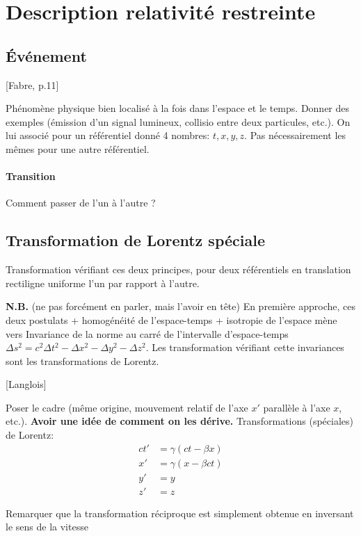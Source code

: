 \documentclass[11pt]{report}
\numberwithin{figure}{section}
\numberwithin{equation}{section}
\numberwithin{table}{section}
\newcommand{\1}{\boldsymbol{1}}
\begin{document}
\section{Description relativité restreinte}

\subsection{Événement}

[Fabre, p.11] 

Phénomène physique bien localisé à la fois dans l'espace et le temps. Donner des exemples (émission d'un signal lumineux, collisio entre deux particules, etc.). On lui associé pour un référentiel donné 4 nombres: $t,x,y,z$. Pas nécessairement les mêmes pour une autre référentiel. 

\paragraph{Transition} Comment passer de l'un à l'autre ?

\subsection{Transformation de Lorentz spéciale}  

Transformation vérifiant ces deux principes, pour deux référentiels en translation rectiligne uniforme l’un par rapport à l’autre.

\textbf{N.B.} (ne pas forcément en parler, mais l'avoir en tête) En première approche, ces deux postulats + homogénéité de l'espace-temps + isotropie de l'espace mène vers Invariance de la norme au carré de
l’intervalle d’espace-temps $\Delta s^2 = c^2 \Delta t^2 - \Delta x^2 - \Delta y^2- \Delta z^2$. Les transformation vérifiant cette invariances sont les transformations de Lorentz.

[Langlois]

Poser le cadre (même origine, mouvement relatif de l'axe $x'$ parallèle à l'axe $x$, etc.). \textbf{Avoir une idée de comment on les dérive.} Transformations (spéciales) de Lorentz:
\begin{align*}
ct' &= \gamma(ct-\beta x) \\
x'  &= \gamma (x-\beta ct) \\
y'  &= y \\
z'  &= z
\end{align*}

Remarquer que la transformation réciproque est simplement obtenue en inversant le sens de la vitesse
\end{document}
